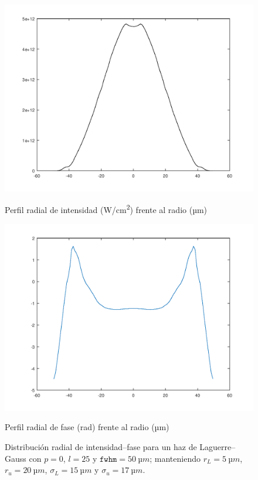 \begin{figure}[htbp]
  \centering
  \begin{subcaptionblock}{.4\textwidth}
    \centering
    \includegraphics[width=\textwidth]{Figuras/ch4_oam7.png}
    \caption{Perfil radial de intensidad (\unit{W/cm^2}) frente al radio (\unit{µm})}\label{fig:ch4_oam7}
  \end{subcaptionblock}
  \begin{subcaptionblock}{.4\textwidth}
    \centering
    \includegraphics[width=\textwidth]{Figuras/ch4_oam8.png}
    \caption{Perfil radial de fase (\unit{rad}) frente al radio (\unit{µm})}\label{fig:ch4_oam8}
  \end{subcaptionblock}
   \caption{Distribución radial de intensidad--fase para un haz de Laguerre--Gauss con $p=0$, $l=25$ y $\texttt{fwhm}=\qty{50}{µm}$; manteniendo $r_{L}=\qty{5}{µm}$, $r_{u}=\qty{20}{µm}$, $\sigma_{L}=\qty{15}{µm}$ y $\sigma_{u}=\qty{17}{µm}$.}
   \label{fig:4.37}
\end{figure}

